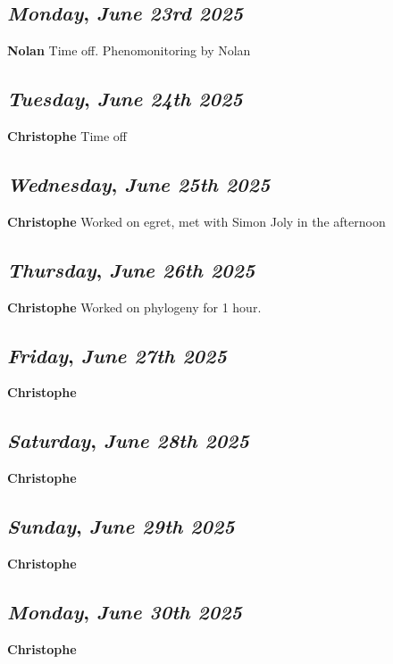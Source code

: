 \def\day{\textit{June 23rd 2025}}
\def\weekday{\textit{Monday}}
\subsection*{\weekday, \day}
\textbf {Nolan}
Time off. Phenomonitoring by Nolan
\def\day{\textit{June 24th 2025}}
\def\weekday{\textit{Tuesday}}
\subsection*{\weekday, \day}
\textbf {Christophe}
Time off
\def\day{\textit{June 25th 2025}}
\def\weekday{\textit{Wednesday}}
\subsection*{\weekday, \day}
\textbf {Christophe}
Worked on egret, met with Simon Joly in the afternoon
\def\day{\textit{June 26th 2025}}
\def\weekday{\textit{Thursday}}
\subsection*{\weekday, \day}
\textbf {Christophe}
Worked on phylogeny for 1 hour.
\def\day{\textit{June 27th 2025}}
\def\weekday{\textit{Friday}}
\subsection*{\weekday, \day}
\textbf {Christophe}

\def\day{\textit{June 28th 2025}}
\def\weekday{\textit{Saturday}}
\subsection*{\weekday, \day}
\textbf {Christophe}

\def\day{\textit{June 29th 2025}}
\def\weekday{\textit{Sunday}}
\subsection*{\weekday, \day}
\textbf {Christophe}

\def\day{\textit{June 30th 2025}}
\def\weekday{\textit{Monday}}
\subsection*{\weekday, \day}
\textbf {Christophe}
